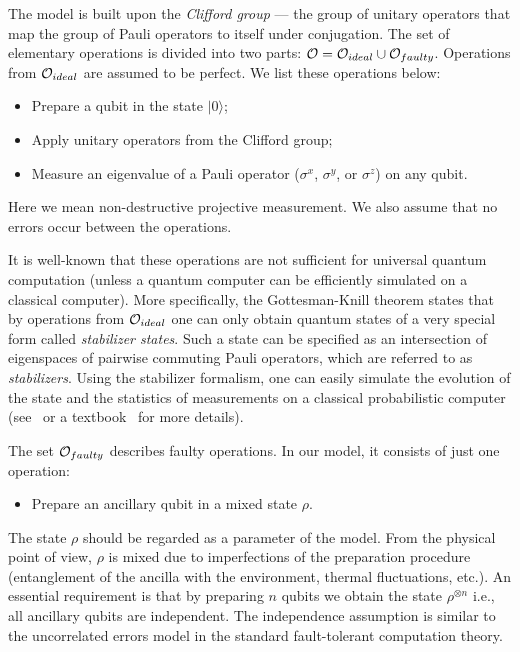 \documentclass[pra,twocolumn,showpacs]{revtex4}
\newcommand{\calO}{{\cal O }}
\newcommand{\ra}{\rangle}
\newcommand{\sx}{\sigma^x}
\newcommand{\sy}{\sigma^y}
\newcommand{\sz}{\sigma^z}
\begin{document}
The model  is built upon the {\it Clifford group} --- the
group of unitary operators that map the group of Pauli operators to itself under conjugation.
The set of elementary operations is divided into two parts:
$\calO=\calO_{ideal}\cup\calO_{faulty}$.  Operations from $\calO_{ideal}$ are
assumed to be perfect.    
 We list these operations below:
\begin{itemize}
\item Prepare a qubit in the state $|0\ra$;
\item Apply unitary operators from the Clifford group;
\item Measure an eigenvalue of a Pauli operator ($\sx$, $\sy$, or $\sz$) on
any qubit.
\end{itemize}
Here we mean non-destructive projective measurement. We also assume that no
errors occur between the operations.

It is well-known that these operations are not sufficient for universal
quantum computation (unless a quantum computer can be efficiently simulated on
a classical computer). More specifically, the Gottesman-Knill theorem states
that by operations from $\calO_{ideal}$ one can only obtain quantum states of
a very special form called {\it stabilizer states}. Such a state can be
specified as an intersection of eigenspaces of pairwise commuting Pauli
operators, which are referred to as {\it stabilizers}.  Using the stabilizer
formalism, one can easily simulate the evolution of the state and the
statistics of measurements on a classical probabilistic computer
(see~\cite{G97} or a textbook~\cite{CN} for more details).

The set $\calO_{faulty}$ describes faulty operations. In our model, it
consists of just one operation:
\begin{itemize}
\item Prepare an ancillary qubit in a mixed state $\rho$.
\end{itemize}
The state $\rho$ should be regarded as a parameter of the model.  From the
physical point of view, $\rho$ is mixed due to imperfections of the
preparation procedure (entanglement of the ancilla with the environment,
thermal fluctuations, etc.). An essential requirement is that by preparing $n$
qubits we obtain the state $\rho^{\otimes n}$ i.e., all ancillary qubits are
independent. The independence assumption is similar to the uncorrelated errors
model in the standard fault-tolerant computation theory.
\end{document}

